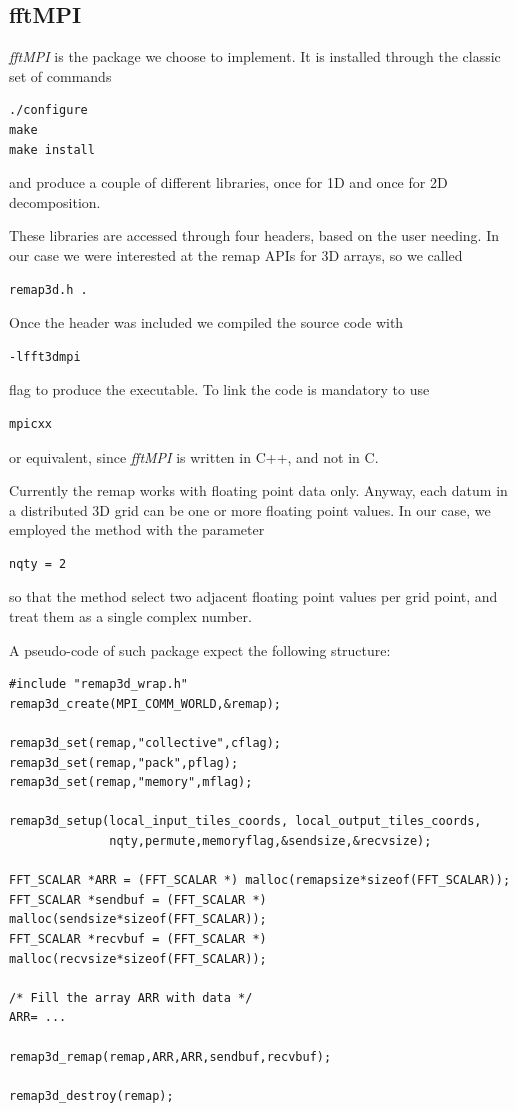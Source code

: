 \subsection{fftMPI}
\emph{fftMPI} is the package we choose to implement. It is installed through the classic set of commands 
\begin{lstlisting}
./configure 
make 
make install
\end{lstlisting}
and produce a couple of different libraries, once for 1D and once for 2D decomposition.
\par
These libraries are accessed through four headers, based on the user needing. In our case we were interested at the remap APIs for 3D arrays, so we called 
\begin{lstlisting} 
remap3d.h .
\end{lstlisting}
Once the header was included we compiled the source code with 
\begin{lstlisting}
-lfft3dmpi
\end{lstlisting}
flag to produce the executable. To link the code is mandatory to use 
\begin{lstlisting}
mpicxx
\end{lstlisting}
or equivalent, since \emph{fftMPI} is written in C++, and not in C. \\
\par
Currently the remap works with floating point data only. Anyway, each datum in a distributed 3D grid can be one or more floating point values. In our case, we employed the method with the parameter
\begin{lstlisting}
nqty = 2
\end{lstlisting}
so that the method select two adjacent floating point values per grid point, and treat them as a single complex number. \\
\par
A pseudo-code of such package expect the following structure:
\begin{lstlisting}
#include "remap3d_wrap.h" 
remap3d_create(MPI_COMM_WORLD,&remap);

remap3d_set(remap,"collective",cflag);
remap3d_set(remap,"pack",pflag);
remap3d_set(remap,"memory",mflag); 

remap3d_setup(local_input_tiles_coords, local_output_tiles_coords,
              nqty,permute,memoryflag,&sendsize,&recvsize); 
              
FFT_SCALAR *ARR = (FFT_SCALAR *) malloc(remapsize*sizeof(FFT_SCALAR));
FFT_SCALAR *sendbuf = (FFT_SCALAR *) malloc(sendsize*sizeof(FFT_SCALAR));
FFT_SCALAR *recvbuf = (FFT_SCALAR *) malloc(recvsize*sizeof(FFT_SCALAR)); 

/* Fill the array ARR with data */
ARR= ...

remap3d_remap(remap,ARR,ARR,sendbuf,recvbuf); 

remap3d_destroy(remap); 
\end{lstlisting}
